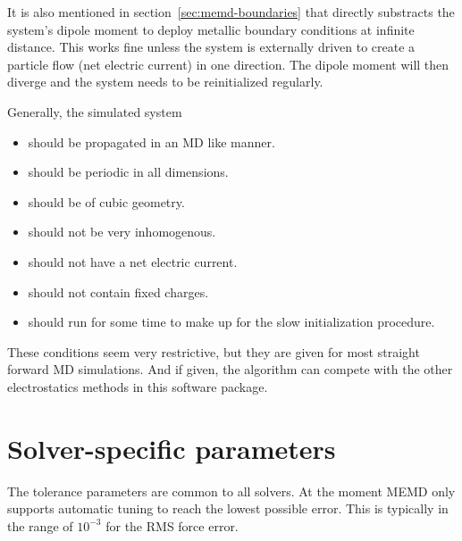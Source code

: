 It is also mentioned in section~\ref{sec:memd-boundaries} that \memd{} directly substracts the system's dipole moment to deploy metallic boundary conditions at infinite distance. This works fine unless the system is externally driven to create a particle flow (net electric current) in one direction. The dipole moment will then diverge and the system needs to be reinitialized regularly.

Generally, the simulated system

\begin{itemize}
\item should be propagated in an MD like manner.
\item should be periodic in all dimensions.
\item should be of cubic geometry.
\item should not be very inhomogenous.
\item should not have a net electric current.
\item should not contain fixed charges.
\item should run for some time to make up for the slow initialization procedure.
\end{itemize}

These conditions seem very restrictive, but they are given for most straight forward MD simulations. And if given, the algorithm can compete with the other electrostatics methods in this software package.


%

\section{Solver-specific parameters}
\label{sec:memd-parameters}

The tolerance parameters are common to all \project{} solvers. At the moment MEMD only supports automatic tuning to reach the lowest possible error. This is typically in the range of $10^{-3}$ for the RMS force error.

